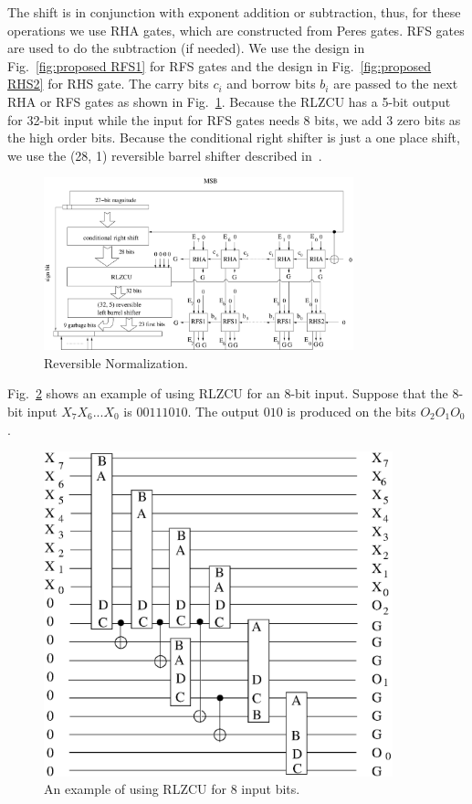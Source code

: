 \documentclass[%
reprint,
 amsmath,amssymb,
 aps,
]{revtex4-1}
\begin{document}
\par The shift is in conjunction with exponent addition or subtraction, thus, for these operations we use RHA gates, which are constructed from Peres gates. RFS gates are used to do the subtraction (if needed). We use the design in Fig.~\ref{fig:proposed RFS1} for RFS gates and the design in Fig.~\ref{fig:proposed RHS2} for RHS gate. The carry bits $c_i$ and borrow bits $b_i$ are passed to the next RHA or RFS gates as shown in Fig.~\ref{fig:normalization}. Because the RLZCU has a 5-bit output for 32-bit input while the input for RFS gates needs 8 bits, we add 3 zero bits as the high order bits. Because the conditional right shifter is just a one place shift, we use the (28, 1) reversible barrel shifter described in~\cite{barrel-shifter}. 

\begin{figure}[ht]
\centering
\includegraphics[width=0.8\textwidth]{normalization.eps}
\caption{Reversible Normalization.}
\label{fig:normalization} 
\end{figure}

\par Fig.~\ref{fig:RLZC_example} shows an example of using RLZCU for an 8-bit input. Suppose that the 8-bit input $X_7X_6...X_0$ is $00111010$. The output $010$ is produced on the bits $O_2O_1O_0$. 

\begin{figure}[h]
\centering
\includegraphics[width=0.9\textwidth]{RLZC-example.eps}
\caption{An example of using RLZCU for 8 input bits.}
\label{fig:RLZC_example}
\end{figure} 
\end{document}
